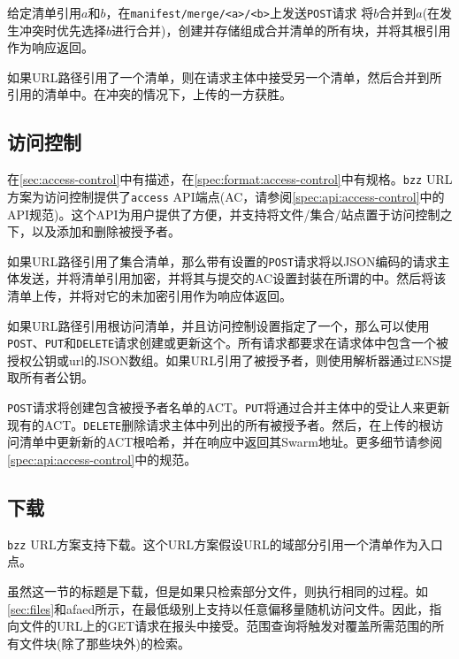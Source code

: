 给定清单引用$a$和$b$，在\lstinline{manifest/merge/<a>/<b>}上发送\lstinline{POST}请求
将$b$合并到$a$(在发生冲突时优先选择$b$进行合并)，创建并存储组成合并清单的所有块，并将其根引用作为响应返回。


如果URL路径引用了一个清单，则在请求主体中接受另一个清单，然后合并到所引用的清单中。在冲突的情况下，上传的一方获胜。 


\subsection{访问控制\statusgreen}\label{sec:access-control-ux}

在\ref{sec:access-control}中有描述，在\ref{spec:format:access-control}中有规格。\lstinline{bzz} URL方案为访问控制提供了\lstinline{access} API端点(AC，请参阅\ref{spec:api:access-control}中的API规范)。这个API为用户提供了方便，并支持将文件/集合/站点置于访问控制之下，以及添加和删除被授予者。

如果URL路径引用了集合清单，那么带有设置的\lstinline{POST}请求将以JSON编码的请求主体发送，并将清单引用加密，并将其与提交的AC设置封装在所谓的中。然后将该清单上传，并将对它的未加密引用作为响应体返回。

如果URL路径引用根访问清单，并且访问控制设置指定了一个，那么可以使用\lstinline{POST}、\lstinline{PUT}和\lstinline{DELETE}请求创建或更新这个。所有请求都要求在请求体中包含一个被授权公钥或url的JSON数组。如果URL引用了被授予者，则使用解析器通过ENS提取所有者公钥。

\lstinline{POST}请求将创建包含被授予者名单的ACT。\lstinline{PUT}将通过合并主体中的受让人来更新现有的ACT。\lstinline{DELETE}删除请求主体中列出的所有被授予者。然后，在上传的根访问清单中更新新的ACT根哈希，并在响应中返回其Swarm地址。更多细节请参阅\ref{spec:api:access-control}中的规范。



\subsection{下载\statusgreen}\label{sec:download}

\lstinline{bzz} URL方案支持下载。这个URL方案假设URL的域部分引用一个清单作为入口点。

虽然这一节的标题是下载，但是如果只检索部分文件，则执行相同的过程。如\ref{sec:files}和afaed所示，在最低级别上支持以任意偏移量随机访问文件。因此，指向文件的URL上的GET请求在报头中接受。范围查询将触发对覆盖所需范围的所有文件块(除了那些块外)的检索。  

